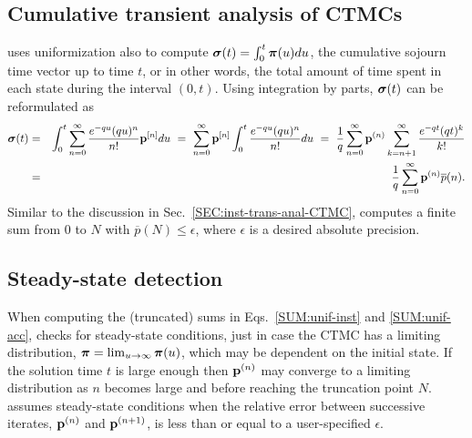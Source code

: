 \subsection{Cumulative transient analysis of CTMCs}\label{SEC:cumul-trans-anal-CTMC}
{\smart} uses uniformization also to compute $\mbox{\boldmath{${\sigma}$}}(t) = \int_0^t
\mbox{\boldmath{${\pi}$}}(u) du$, the cumulative sojourn time vector up to time $t$, or in other words,
the total amount of time spent in each state during the interval $(0,t)$.
Using integration by parts, $\mbox{\boldmath{${\sigma}$}}(t)$ can be reformulated as
\begin{eqnarray}
  \nonumber
  \mbox{\boldmath{${\sigma}$}}(t) 
  & = & \int_{0}^{t}
    \sum_{n=0}^{\infty} \frac{e^{-q u} (q u)^n}{n!} \mathbf{p}^{[n]} d u
  ~ = ~ \sum_{n=0}^{\infty} \mathbf{p}^{[n]}
    \int_{0}^{t} \frac{e^{-q u} (q u)^n}{n!} d u
  ~ = ~ \frac{1}{q} \sum_{n=0}^{\infty} \mathbf{p}^{(n)} \sum_{k=n+1}^{\infty}
  \frac{e^{-q t} (q t)^k}{k!} 
  \\
  & = &
  \frac{1}{q} \sum_{n=0}^{\infty} \mathbf{p}^{(n)} \overline{p}(n).
  \label{SUM:unif-acc}
\end{eqnarray}
Similar to the discussion in Sec.~\ref{SEC:inst-trans-anal-CTMC},
{\smart} computes a finite sum from $0$ to $N$
with $\overline{p}(N) \le \epsilon$,
where $\epsilon$ is a desired absolute precision.



\subsection{Steady-state detection}
When computing the (truncated) sums in Eqs.~\ref{SUM:unif-inst} and \ref{SUM:unif-acc},
{\smart} checks for steady-state conditions,
just in case the CTMC has a limiting distribution,
$\mbox{\boldmath{${\pi}$}}=\lim_{u\to\infty} \mbox{\boldmath{${\pi}$}}(u)$, which may be dependent on the initial state.
If the solution time $t$ is large enough then $\mathbf{p}^{(n)}$ may converge to a limiting distribution
as $n$ becomes large and before reaching the truncation point $N$.
{\smart} assumes steady-state conditions when the relative error between successive iterates,
$\mathbf{p}^{(n)}$ and $\mathbf{p}^{(n+1)}$, is less than or equal to a user-specified $\epsilon$.


